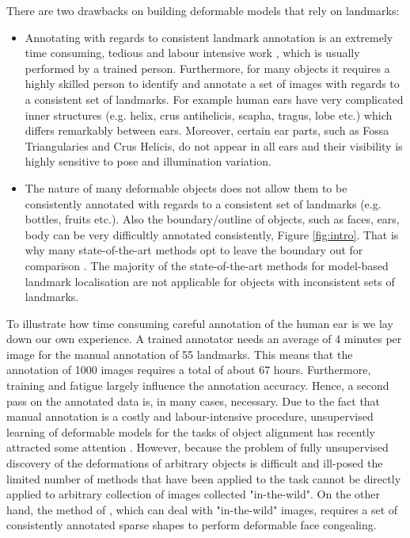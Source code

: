 There are two drawbacks on building deformable models that rely on landmarks:
\begin{itemize}

\item Annotating with regards to consistent landmark annotation is an extremely time consuming, tedious and labour intensive work \cite{sagonas_iccv_300w_2013}, which is usually performed by a trained person. Furthermore, for many objects it requires a highly skilled person to identify and annotate a set of images with regards to a consistent set of landmarks. For example human ears have very complicated inner structures (e.g. helix, crus antihelicis, scapha, tragus, lobe etc.) which differs remarkably between ears. Moreover, certain ear parts, such as  Fossa Triangularies and Crus Helicis, do not appear in all ears and  their visibility is highly sensitive to pose and illumination variation.

\item The nature of many deformable objects does not allow them to be consistently annotated with regards to a consistent set of landmarks (e.g. bottles, fruits etc.). Also the boundary/outline of objects, such as faces, ears, body can be very difficultly annotated consistently, Figure \ref{fig:intro}. That is why many state-of-the-art methods opt to leave the boundary out for comparison \cite{Tzimiropoulos2014, Asthana2014}. The majority of the state-of-the-art methods for model-based landmark localisation \cite{Cao2012, Zhu2012, Xiong2013, Tzimiropoulos2014, Asthana2014} are not applicable for objects with inconsistent sets of landmarks.

\end{itemize}

To illustrate how time consuming careful annotation of the human ear is we lay down our own experience. A trained annotator needs an average of 4 minutes per image for the manual annotation of 55 landmarks. This means that the annotation of 1000 images requires a total of about 67 hours. Furthermore,  training and fatigue largely influence the annotation accuracy. Hence, a second pass on the annotated data is, in many cases, necessary. Due to the fact that manual annotation is a costly and labour-intensive procedure, unsupervised learning of deformable models for the tasks of object alignment has recently attracted some attention \cite{frey2003learning, baker2004automatic, cootes2004groupwise, jojic2006escaping, Huang2006, kokkinos2007unsupervised, jiang2009learning, liu2009simultaneous, Zhang2012}. However, because the problem of fully unsupervised discovery of the deformations of arbitrary objects is difficult and ill-posed the limited number of methods that have been applied to the task cannot be directly applied to arbitrary collection of images collected "in-the-wild". On the other hand, the method of \cite{antonakos2014automatic}, which can deal with "in-the-wild" images, requires a set of consistently annotated sparse shapes to perform deformable face congealing.


